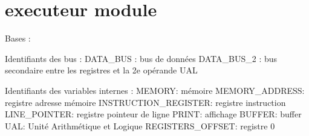 \documentclass[letterpaper,10pt,french]{sphinxmanual}
\begin{document}
\section{executeur module}
\label{\detokenize{executeur:module-executeur}}\label{\detokenize{executeur:executeur-module}}\label{\detokenize{executeur::doc}}\label{\detokenize{executeur:module-executeur}}

\begin{fulllineitems}
\label{\detokenize{executeur:executeur.Executeur}}
Bases : 

Identifiants des bus :
\sphinxhyphen{} DATA\_BUS : bus de données
\sphinxhyphen{} DATA\_BUS\_2 : bus secondaire entre les registres et la 2e opérande UAL

Identifiants des variables internes :
\sphinxhyphen{} MEMORY: mémoire
\sphinxhyphen{} MEMORY\_ADDRESS: registre adresse mémoire
\sphinxhyphen{} INSTRUCTION\_REGISTER: registre instruction
\sphinxhyphen{} LINE\_POINTER: registre pointeur de ligne
\sphinxhyphen{} PRINT: affichage
\sphinxhyphen{} BUFFER: buffer
\sphinxhyphen{} UAL: Unité Arithmétique et Logique
\sphinxhyphen{} REGISTERS\_OFFSET: registre 0

\begin{fulllineitems}
\label{\detokenize{executeur:executeur.Executeur.BUFFER}}
\end{fulllineitems}


\begin{fulllineitems}
\label{\detokenize{executeur:executeur.Executeur.DATA_BUS}}
\end{fulllineitems}


\end{fulllineitems}
\end{document}
